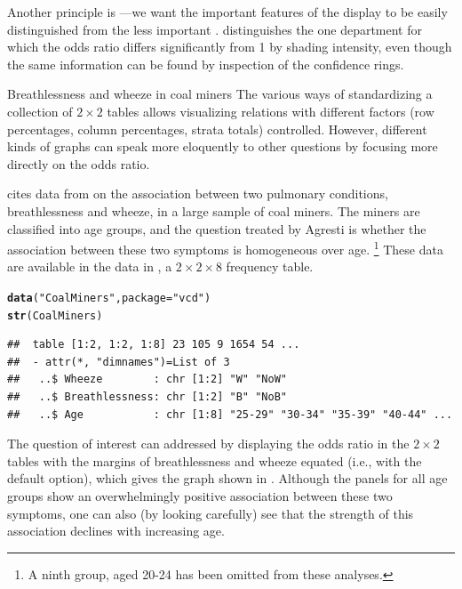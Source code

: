 \documentclass[11pt]{book}\usepackage[]{graphicx}\usepackage[]{color}
\makeatletter
\newcommand{\hlstr}[1]{\textcolor[rgb]{0.192,0.494,0.8}{#1}}%
\newcommand{\hlstd}[1]{\textcolor[rgb]{0.345,0.345,0.345}{#1}}%
\newcommand{\hlkwc}[1]{\textcolor[rgb]{0.333,0.667,0.333}{#1}}%
\newcommand{\hlkwd}[1]{\textcolor[rgb]{0.737,0.353,0.396}{\textbf{#1}}}%
\newenvironment{kframe}{%
 \def\at@end@of@kframe{}%
 \ifinner\ifhmode%
  \def\at@end@of@kframe{\end{minipage}}%
  \begin{minipage}{\columnwidth}%
 \fi\fi%
 \def\FrameCommand##1{\hskip\@totalleftmargin \hskip-\fboxsep
 \colorbox{shadecolor}{##1}\hskip-\fboxsep
     \hskip-\linewidth \hskip-\@totalleftmargin \hskip\columnwidth}%
 \MakeFramed {\advance\hsize-\width
   \@totalleftmargin\z@ \linewidth\hsize
   \@setminipage}}%
 {\par\unskip\endMakeFramed%
 \at@end@of@kframe}
\newenvironment{knitrout}{}{} %
\renewenvironment{knitrout}{\small\renewcommand{\baselinestretch}{.85}}{} %
\makeatother
\begin{document}
Another principle is ---we want the important
features
of the display to be easily distinguished from the less important
\citep{Tukey:93}.
 distinguishes the one department for which
the odds ratio differs significantly from 1 by shading intensity,
even though the same information can be found by inspection of the
confidence rings.

\begin{Example}[wheeze1]{Breathlessness and wheeze in coal miners}
The various ways of standardizing a collection of $2 \times 2$ tables
allows visualizing relations with different factors
(row percentages, column percentages, strata totals) controlled.
However, different kinds of graphs can speak more eloquently to other questions by focusing more directly on the odds ratio.

\citet[Table 9.8]{Agresti:2002} cites data from
\citet{AshfordSnowden:70} on the association between
two pulmonary conditions, breathlessness and wheeze, in a large sample of coal miners.
The miners are classified into age groups, and the question treated
by Agresti is whether the association between these two symptoms
is homogeneous over age.%
\footnote{A ninth group, aged 20-24 has been omitted from these
analyses.}
These data are available in the  data in
, a $2 \times 2 \times 8$ frequency table.
\begin{knitrout}
\color{fgcolor}\begin{kframe}
\begin{alltt}
\hlkwd{data}\hlstd{(}\hlstr{"CoalMiners"}\hlstd{,} \hlkwc{package}\hlstd{=}\hlstr{"vcd"}\hlstd{)}
\hlkwd{str}\hlstd{(CoalMiners)}
\end{alltt}
\begin{verbatim}
##  table [1:2, 1:2, 1:8] 23 105 9 1654 54 ...
##  - attr(*, "dimnames")=List of 3
##   ..$ Wheeze        : chr [1:2] "W" "NoW"
##   ..$ Breathlessness: chr [1:2] "B" "NoB"
##   ..$ Age           : chr [1:8] "25-29" "30-34" "35-39" "40-44" ...
\end{verbatim}
\end{kframe}
\end{knitrout}


The question of interest
can addressed by displaying the odds ratio
in the $2 \times 2$ tables with the margins of breathlessness
and wheeze equated (i.e., with the default  option),
which gives the graph shown in .
Although the panels for all age groups show an overwhelmingly
positive association between these two symptoms, one can also
(by looking carefully)
see that the strength of this association declines with increasing
age.


\end{Example}
\end{document}
